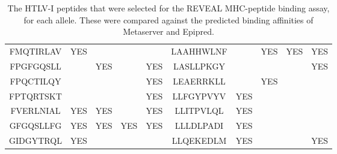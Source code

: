 \begin{table}[htp]
\begin{center}
\begin{sideways}
\begin{tabulary}{1.5\textwidth}{|c|c|c|c|c|c|c|c|c|c|}
FMQTIRLAV & YES &  &  &  & LAAHHWLNF &  & YES & YES & YES \\
FPGFGQSLL &  & YES &  & YES & LASLLPKGY &  &  &  & YES \\
FPQCTILQY &  &  &  & YES & LEAERRKLL &  & YES &  &  \\
FPTQRTSKT &  &  &  & YES & LLFGYPVYV & YES &  &  &  \\
FVERLNIAL & YES & YES &  & YES & LLITPVLQL & YES &  &  &  \\
GFGQSLLFG & YES & YES & YES & YES & LLLDLPADI & YES &  &  &  \\
GIDGYTRQL & YES &  &  &  & LLQEKEDLM & YES &  &  & YES \bigstrut[b] \\
\hline
\end{tabulary}
\end{sideways}
\end{center}
\caption[The REVEAL binding assay peptides]{The HTLV-I peptides that were selected for the REVEAL MHC-peptide binding assay, for each allele. These were compared against the predicted binding affinities of Metaserver and Epipred.}
\label{appendixc/table1}
\end{table}


